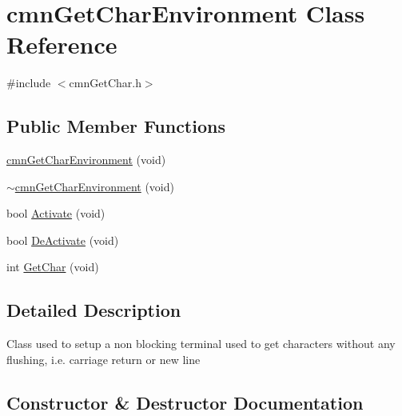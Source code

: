 \hypertarget{classcmn_get_char_environment}{}\section{cmn\+Get\+Char\+Environment Class Reference}
\label{classcmn_get_char_environment}


{\ttfamily \#include $<$cmn\+Get\+Char.\+h$>$}

\subsection*{Public Member Functions}
\begin{DoxyCompactItemize}
\item 
\hyperlink{classcmn_get_char_environment_a951bc89ff0713859a6548ab97106ed4f}{cmn\+Get\+Char\+Environment} (void)
\item 
\hyperlink{classcmn_get_char_environment_a1fa4ed0d43ea4af15529823f1c5df363}{$\sim$cmn\+Get\+Char\+Environment} (void)
\item 
bool \hyperlink{classcmn_get_char_environment_abb820044ffa1dcaf0519d9d8579e2b03}{Activate} (void)
\item 
bool \hyperlink{classcmn_get_char_environment_a18949b557a5c1c74b8b10bf90fe3a8d1}{De\+Activate} (void)
\item 
int \hyperlink{classcmn_get_char_environment_a87cdc91fcaf5144c864e744474f30dde}{Get\+Char} (void)
\end{DoxyCompactItemize}


\subsection{Detailed Description}
Class used to setup a non blocking terminal used to get characters without any flushing, i.\+e. carriage return or new line 

\subsection{Constructor \& Destructor Documentation}
\hypertarget{classcmn_get_char_environment_a951bc89ff0713859a6548ab97106ed4f}{}
